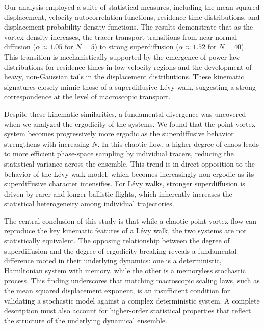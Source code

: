 \documentclass[]{article}
\begin{document}
Our analysis employed a suite of statistical measures, including the mean squared displacement, velocity autocorrelation functions, residence time distributions, and displacement probability density functions. The results demonstrate that as the vortex density increases, the tracer transport transitions from near-normal diffusion ($\alpha \approx 1.05$ for $N=5$) to strong superdiffusion ($\alpha \approx 1.52$ for $N=40$). This transition is mechanistically supported by the emergence of power-law distributions for residence times in low-velocity regions and the development of heavy, non-Gaussian tails in the displacement distributions. These kinematic signatures closely mimic those of a superdiffusive Lévy walk, suggesting a strong correspondence at the level of macroscopic transport.

Despite these kinematic similarities, a fundamental divergence was uncovered when we analyzed the ergodicity of the systems. We found that the point-vortex system becomes progressively more ergodic as the superdiffusive behavior strengthens with increasing $N$. In this chaotic flow, a higher degree of chaos leads to more efficient phase-space sampling by individual tracers, reducing the statistical variance across the ensemble. This trend is in direct opposition to the behavior of the Lévy walk model, which becomes increasingly non-ergodic as its superdiffusive character intensifies. For Lévy walks, stronger superdiffusion is driven by rarer and longer ballistic flights, which inherently increases the statistical heterogeneity among individual trajectories.

The central conclusion of this study is that while a chaotic point-vortex flow can reproduce the key kinematic features of a Lévy walk, the two systems are not statistically equivalent. The opposing relationship between the degree of superdiffusion and the degree of ergodicity breaking reveals a fundamental difference rooted in their underlying dynamics: one is a deterministic, Hamiltonian system with memory, while the other is a memoryless stochastic process. This finding underscores that matching macroscopic scaling laws, such as the mean squared displacement exponent, is an insufficient condition for validating a stochastic model against a complex deterministic system. A complete description must also account for higher-order statistical properties that reflect the structure of the underlying dynamical ensemble.


{}

\end{document}
